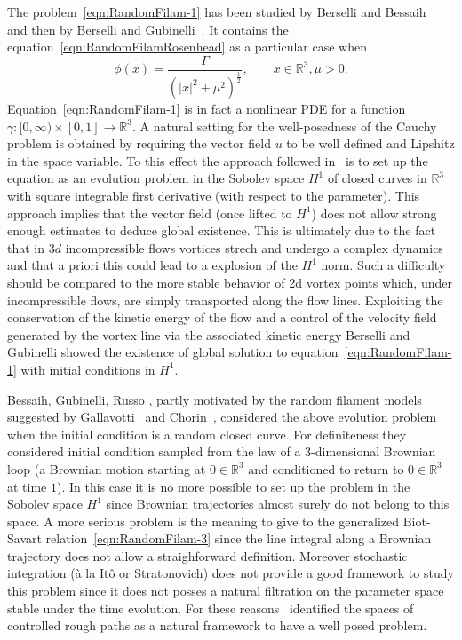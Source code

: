 \documentclass[11pt,a4paper,reqno]{amsart}%
\newcommand\half{\frac12}
\theoremstyle{plain}
\theoremstyle{remark}
\theoremstyle{plain}
\numberwithin{equation}{section}
\begin{document}
The problem~\eqref{eqn:RandomFilam-1} has been studied  by Berselli and Bessaih~\cite{[Bers+Bess_2002]} and then by Berselli and Gubinelli~\cite{[Bers+Gub_2007]}.
It contains the equation~\eqref{eqn:RandomFilamRosenhead}  as a  particular case when
\[
\phi({x})=\frac{\Gamma}{(\vert {x}\vert^2+\mu^2)^{\half}},\qquad {x}\in\mathbb{R}^3,\mu>0.
\]
Equation~\eqref{eqn:RandomFilam-1} is in fact  a nonlinear PDE for a function $\gamma: [0,\infty)\times[0,1]\to \mathbb{R}^3$. A natural setting for the  well-posedness of the  Cauchy problem is obtained by requiring  the vector field $u$ to be well defined and Lipshitz in the space variable.
To this effect the approach followed in~\cite{[Bers+Bess_2002]} is to set up the equation as an evolution problem in the Sobolev space $H^1$ of closed curves in $\mathbb{R}^3$ with square integrable first derivative (with respect to the parameter). This approach implies that the vector field (once lifted to $H^1$) does not allow   strong enough estimates to  deduce global existence.
This is ultimately due to the fact that in $3d$ incompressible flows vortices strech and undergo a complex dynamics and that a priori this could lead to a explosion of the $H^1$ norm.
Such a difficulty should be compared to the more stable behavior of 2d vortex points which, under incompressible flows, are simply transported along the flow lines.
Exploiting the conservation of the kinetic energy of the flow and a control of the velocity field generated by the vortex line via the associated kinetic energy Berselli and  Gubinelli \cite{[Bers+Gub_2007]}  showed the existence of global solution to  equation~\eqref{eqn:RandomFilam-1} with initial conditions in $H^1$.

Bessaih, Gubinelli, Russo \cite{[Bess+Gub_2005]}, partly motivated by the random filament models suggested by Gallavotti~\cite{Gallavotti} and  Chorin~\cite{Chorin}, considered the above evolution problem when the initial condition is a random closed curve. For definiteness they  considered initial condition sampled from the law of a $3$-dimensional Brownian loop (a Brownian motion starting at $0\in\mathbb{R}^3$ and conditioned to return to $0\in\mathbb{R}^3$ at time $1$).
In this case it is no more possible to set up the problem in the Sobolev space $H^1$ since Brownian trajectories almost surely do not belong to this space. A more serious problem is the meaning to give to the generalized Biot-Savart relation~\eqref{eqn:RandomFilam-3} since the line integral along a Brownian trajectory does not allow a straighforward definition. Moreover stochastic integration (\`a la It\^o or Stratonovich) does not provide a good framework to study this problem since it does not posses a natural filtration on the parameter space  stable under the time evolution. For these reasons~\cite{[Bess+Gub_2005]} identified the spaces of controlled rough paths as a natural framework to have a well posed problem.
\end{document}
